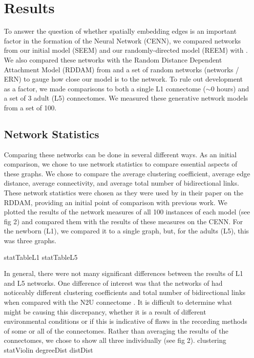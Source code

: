 \section{Results}

To answer the question of whether spatially embedding edges is an important factor in the formation of the \ce Neural Network (CENN), we compared networks from our initial model (SEEM) and our randomly-directed model (REEM) with \ce. 
We also compared these networks with the Random Distance Dependent Attachment Model (RDDAM) from \cite{Itzhack} and a set of random networks (\er networks / ERN) to gauge how close our model is to the \ce network. 
To rule out development as a factor, we made comparisons to both a single L1 connectome ($\sim 0$ hours) and a set of 3 adult (L5) connectomes. 
We measured these generative network models from a set of 100.

\subsection{Network Statistics}
Comparing these networks can be done in several different ways. As an initial comparison, we chose to use network statistics to compare essential aspects of these graphs. We chose to compare the average clustering coefficient, average edge distance, average connectivity, and average total number of bidirectional links. These network statistics were chosen as they were used by \cite{Itzhack} in their paper on the RDDAM, providing an initial point of comparison with previous work. We plotted the results of the network measures of all 100 instances of each model (see fig 2) and compared them with the results of these measures on the CENN. For the newborn (L1), we compared it to a single graph, but, for the adults (L5), this was three graphs.

{statTableL1}
{statTableL5}  

In general, there were not many significant differences between the results of L1 and L5 networks. One difference of interest was that the networks of \cite{Witvliet} had noticeably different clustering coefficients and total number of bidirectional links when compared with the N2U connectome \citep{Durbin}.
It is difficult to determine what might be causing this discrepancy, whether it is a result of different environmental conditions or if this is indicative of flaws in the recording methods of some or all of the connectomes. Rather than averaging the results of the connectomes, we chose to show all three individually (see fig 2). 
{clustering}
{statViolin}
{degreeDist}
{distDist}

